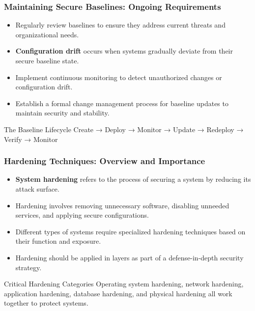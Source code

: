 \documentclass{beamer}
\begin{document}
\begin{frame}
    \frametitle{Maintaining Secure Baselines: Ongoing Requirements}
    
    \begin{itemize}
        \item Regularly review baselines to ensure they address current threats and organizational needs.
        \item \textbf{Configuration drift} occurs when systems gradually deviate from their secure baseline state.
        \item Implement continuous monitoring to detect unauthorized changes or configuration drift.
        \item Establish a formal change management process for baseline updates to maintain security and stability.
    \end{itemize}
    
    \begin{block}{The Baseline Lifecycle}
        Create → Deploy → Monitor → Update → Redeploy → Verify → Monitor
    \end{block}
\end{frame}

\begin{frame}
    \frametitle{Hardening Techniques: Overview and Importance}
    
    \begin{itemize}
        \item \textbf{System hardening} refers to the process of securing a system by reducing its attack surface.
        \item Hardening involves removing unnecessary software, disabling unneeded services, and applying secure configurations.
        \item Different types of systems require specialized hardening techniques based on their function and exposure.
        \item Hardening should be applied in layers as part of a defense-in-depth security strategy.
    \end{itemize}
    
    \begin{alertblock}{Critical Hardening Categories}
        Operating system hardening, network hardening, application hardening, database hardening, and physical hardening all work together to protect systems.
    \end{alertblock}
\end{frame}
\end{document}
